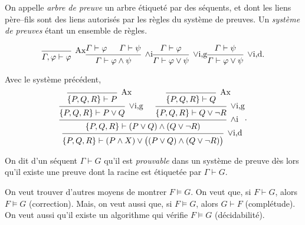 \begin{defn}
	On appelle \textit{arbre de preuve} un arbre étiqueté par des séquents, et dont les liens père--fils sont des liens autorisés par les règles du système de preuves. Un \textit{système de preuves} étant un ensemble de règles.
\end{defn}

\begin{exm}
	\[
		\begin{prooftree}
			\infer 0[Ax]{\Gamma, \varphi \vdash \varphi} %
		\end{prooftree}
		\begin{prooftree}
			\hypo{\Gamma \vdash \varphi}
			\hypo{\Gamma \vdash \psi} %
			\infer 2[$\land$i]{\Gamma \vdash \varphi \land \psi}
		\end{prooftree}
		\begin{prooftree}
			\hypo{\Gamma \vdash \varphi} %
			\infer 1[$\lor$i,g]{\Gamma \vdash \varphi \lor\psi}
		\end{prooftree}
		\begin{prooftree}
			\hypo{\Gamma \vdash \psi} %
			\infer 1[$\lor$i,d]{\Gamma \vdash \varphi \lor\psi}
		\end{prooftree}
	.\] 
\end{exm}

\begin{exm}
	Avec le système précédent, \[
		\begin{prooftree}
			\infer0[Ax]{\{P,Q,R\} \vdash P}
			\infer1[$\lor$i,g]{\{P,Q,R\} \vdash P \lor Q}
			\infer0[Ax]{\{P,Q,R\} \vdash Q}
			\infer1[$\lor$i,g]{\{P,Q,R\} \vdash Q \lor\lnot R}
			\infer2[$\land$i]{\{P,Q,R\} \vdash (P \lor Q) \land(Q \lor\lnot R)}
			\infer1[$\lor$i,d]{\{P,Q,R\} \vdash(P \land X) \lor\big((P\lor Q) \land (Q \lor\lnot R)\big)}
		\end{prooftree}
	.\]
\end{exm}

\begin{defn}
	On dit d'un séquent $\Gamma \vdash G$\/ qu'il est \textit{prouvable} dans un système de preuve dès lors qu'il existe une preuve dont la racine est étiquetée par $\Gamma \vdash G$.
\end{defn}

\begin{rap}[objectifs]
	On veut trouver d'autres moyens de montrer $F \models G$.
	On veut que, si $F \vdash G$, alors $F \models G$ (correction).
	Mais, on veut aussi que, si $F \models G$, alors $G \vdash F$ (complétude).
	On veut aussi qu'il existe un algorithme qui vérifie $F \models G$ (décidabilité).
\end{rap}

